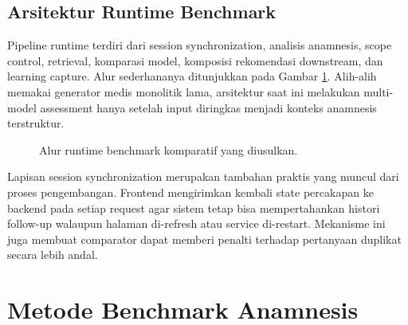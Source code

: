 \documentclass[conference]{IEEEtran}
\begin{document}
\subsection{Arsitektur Runtime Benchmark}
Pipeline runtime terdiri dari session synchronization, analisis anamnesis, scope control, retrieval, komparasi model, komposisi rekomendasi downstream, dan learning capture. Alur sederhananya ditunjukkan pada Gambar \ref{fig:workflow_id}. Alih-alih memakai generator medis monolitik lama, arsitektur saat ini melakukan multi-model assessment hanya setelah input diringkas menjadi konteks anamnesis terstruktur.

\begin{figure}[t]
\centering
{}
\caption{Alur runtime benchmark komparatif yang diusulkan.}
\label{fig:workflow_id}
\end{figure}

Lapisan session synchronization merupakan tambahan praktis yang muncul dari proses pengembangan. Frontend mengirimkan kembali state percakapan ke backend pada setiap request agar sistem tetap bisa mempertahankan histori follow-up walaupun halaman di-refresh atau service di-restart. Mekanisme ini juga membuat comparator dapat memberi penalti terhadap pertanyaan duplikat secara lebih andal.

\section{Metode Benchmark Anamnesis}
\end{document}
